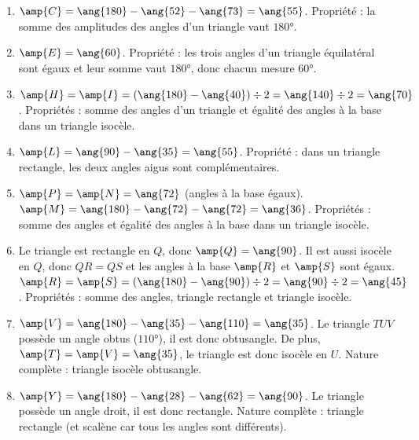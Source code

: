 %
%
    \begin{enumerate}
        \item $\amp{C} = \ang{180} - \ang{52} - \ang{73} = \ang{55}$. Propriété : la somme des amplitudes des angles d'un triangle vaut $\ang{180}$.

        \item $\amp{E} = \ang{60}$. Propriété : les trois angles d'un triangle équilatéral sont égaux et leur somme vaut $\ang{180}$, donc chacun mesure $\ang{60}$.

        \item $\amp{H} = \amp{I} = (\ang{180} - \ang{40}) \div 2 = \ang{140} \div 2 = \ang{70}$. Propriétés : somme des angles d'un triangle et égalité des angles à la base dans un triangle isocèle.

        \item $\amp{L} = \ang{90} - \ang{35} = \ang{55}$. Propriété : dans un triangle rectangle, les deux angles aigus sont complémentaires.

        \item $\amp{P} = \amp{N} = \ang{72}$ (angles à la base égaux). $\amp{M} = \ang{180} - \ang{72} - \ang{72} = \ang{36}$. Propriétés : somme des angles et égalité des angles à la base dans un triangle isocèle.

        \item Le triangle est rectangle en $Q$, donc $\amp{Q} = \ang{90}$. Il est aussi isocèle en $Q$, donc $QR = QS$ et les angles à la base $\amp{R}$ et $\amp{S}$ sont égaux. $\amp{R} = \amp{S} = (\ang{180} - \ang{90}) \div 2 = \ang{90} \div 2 = \ang{45}$. Propriétés : somme des angles, triangle rectangle et triangle isocèle.

        \item $\amp{V} = \ang{180} - \ang{35} - \ang{110} = \ang{35}$. Le triangle $TUV$ possède un angle obtus ($\ang{110}$), il est donc obtusangle. De plus, $\amp{T} = \amp{V} = \ang{35}$, le triangle est donc isocèle en $U$. Nature complète : triangle isocèle obtusangle.

        \item $\amp{Y} = \ang{180} - \ang{28} - \ang{62} = \ang{90}$. Le triangle possède un angle droit, il est donc rectangle. Nature complète : triangle rectangle (et scalène car tous les angles sont différents).
    \end{enumerate}
